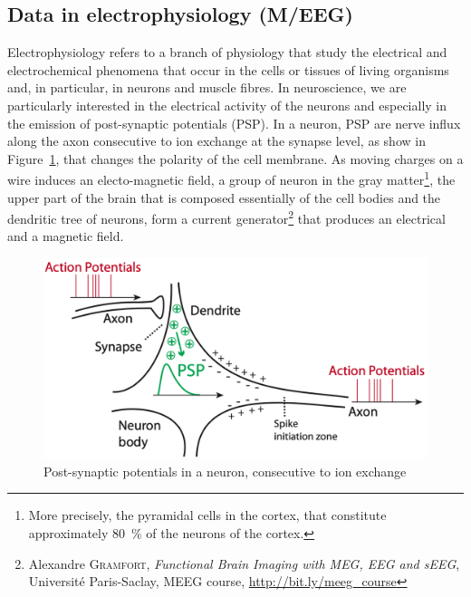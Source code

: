 \subsection{Data in electrophysiology (M/EEG)}\label{data_in_electrophysiology}

Electrophysiology refers to a branch of physiology that study the electrical and electrochemical phenomena that occur in the cells or tissues of living organisms and, in particular, in neurons and muscle fibres.
In neuroscience, we are particularly interested in the electrical activity of the neurons and especially in the emission of post-synaptic potentials (PSP).
In a neuron, PSP are nerve influx along the axon consecutive to ion exchange at the synapse level, as show in Figure~\ref{fig:post_synaptic_potentials}, that changes the polarity of the cell membrane.
As moving charges on a wire induces an electo-magnetic field, a group of neuron in the gray matter\footnote{More precisely, the pyramidal cells in the cortex, that constitute approximately \SI{80}{\percent} of the neurons of the cortex.}, the upper part of the brain that is composed essentially of the cell bodies and the dendritic tree of neurons, form a current generator\footnote{Alexandre \textsc{Gramfort}, \textit{ Functional Brain Imaging with MEG, EEG and sEEG}, Université Paris-Saclay, MEEG course, \url{http://bit.ly/meeg_course}} that produces an electrical and a magnetic field.

\begin{figure}[h]
    \centering
    \includegraphics[scale=0.25]{pics/post-synaptic_potentials.png}
    \caption{Post-synaptic potentials in a neuron, consecutive to ion exchange}
    \label{fig:post_synaptic_potentials}
\end{figure}


